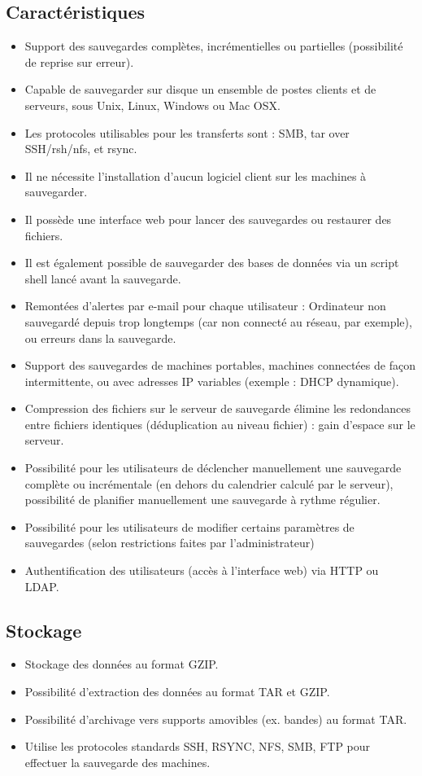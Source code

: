 \documentclass[a4paper,11pt]{report}
\begin{document}
\subsection{Caractéristiques}
\begin{itemize}
  \item Support des sauvegardes complètes, incrémentielles ou partielles (possibilité de reprise sur erreur).
  \item Capable de sauvegarder sur disque un ensemble de postes clients et de serveurs, sous Unix, Linux, Windows ou Mac OSX. 
  \item Les protocoles utilisables pour les transferts sont : SMB, tar over SSH/rsh/nfs, et rsync. 
  \item Il ne nécessite l'installation d'aucun logiciel client sur les machines à sauvegarder.
  \item Il possède une interface web pour lancer des sauvegardes ou restaurer des fichiers. 
  \item Il est également possible de sauvegarder des bases de données via un script shell lancé avant la sauvegarde.
  \item Remontées d'alertes par e-mail pour chaque utilisateur : Ordinateur non sauvegardé depuis trop longtemps (car non connecté au réseau, par exemple), ou erreurs dans la sauvegarde.
  \item Support des sauvegardes de machines portables, machines connectées de façon intermittente, ou avec adresses IP variables (exemple : DHCP dynamique).
  \item Compression des fichiers sur le serveur de sauvegarde
élimine les redondances entre fichiers identiques (déduplication au niveau fichier) : gain d'espace sur le serveur.
  \item Possibilité pour les utilisateurs de déclencher manuellement une sauvegarde complète ou incrémentale (en dehors du calendrier calculé par le serveur), possibilité de planifier manuellement une sauvegarde à rythme régulier.
  \item Possibilité pour les utilisateurs de modifier certains paramètres de sauvegardes (selon restrictions faites par l'administrateur)
  \item Authentification des utilisateurs (accès à l'interface web) via HTTP ou LDAP.
\end{itemize}

\subsection{Stockage}
\begin{itemize}
  \item Stockage des données au format GZIP.
  \item Possibilité d'extraction des données au format TAR et GZIP.
  \item Possibilité d'archivage vers supports amovibles (ex. bandes) au format TAR.
  \item Utilise les protocoles standards SSH, RSYNC, NFS, SMB, FTP pour effectuer la sauvegarde des machines.
\end{itemize}
\end{document}
